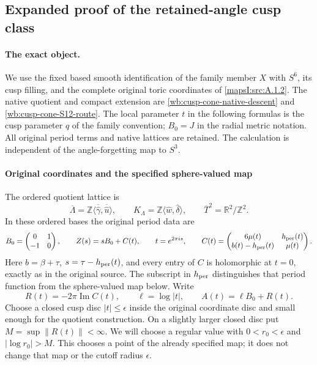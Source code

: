 \subsection{Expanded proof of the retained-angle cusp class}
\label{wb:h24:ret:section}

\paragraph{The exact object.}
We use the fixed based smooth identification of the family member $X$ with
$S^6$, its cusp filling, and the complete original toric coordinates of
\cref{mapsI:src:A.1.2}. The native quotient and compact extension are
\cref{wb:cusp-cone-native-descent} and \cref{wb:cusp-cone-S12-route}.
The local parameter $t$ in the following formulas is the cusp parameter
$q$ of the family convention; $B_0=J$ in the radial metric notation.
All original period terms and native lattices are retained. The
calculation is independent of the angle-forgetting map to $S^3$.

\paragraph{Original coordinates and the specified sphere-valued map}

The ordered quotient lattice is
\[
 \overline\Lambda=\mathbb Z\langle\overline{\widehat\gamma},
              \overline{\widehat u}\rangle,
 \qquad
 K_\Lambda=\mathbb Z\langle\widehat w,\widehat\delta\rangle,
 \qquad
 \overline T^2=\mathbb R^2/\mathbb Z^2.
\]
In these ordered bases the original period data are
\begin{equation}
 B_0=\begin{pmatrix}0&1\\-1&0\end{pmatrix},\qquad
 Z(s)=sB_0+C(t),\qquad t=e^{2\pi i s},\qquad
 C(t)=\begin{pmatrix}6\mu(t)&h_{\rm per}(t)\\
 b(t)-h_{\rm per}(t)&\mu(t)\end{pmatrix}.
 \label{wb:h24:ret:eq:original-periods}
\end{equation}
Here \(b=\beta+\tau\), \(s=\tau-h_{\rm per}(t)\), and every entry of
\(C\) is holomorphic at \(t=0\), exactly as in the original source.
The subscript in \(h_{\rm per}\) distinguishes that period function
from the sphere-valued map below.  Write
\begin{equation}
 R(t)=-2\pi\operatorname{Im}C(t),\qquad
 \ell=\log|t|,\qquad A(t)=\ell B_0+R(t).
 \label{wb:h24:ret:eq:A}
\end{equation}
Choose a closed cusp disc \(|t|\leq\epsilon\) inside the original
coordinate disc and small enough for the quotient construction.  On a
slightly larger closed disc put \(M=\sup\|R(t)\|<\infty\).  We will
choose a regular value with \(0<r_0<\epsilon\) and
\(|\log r_0|>M\).  This chooses a point of the already specified map;
it does not change that map or the cutoff radius \(\epsilon\).

